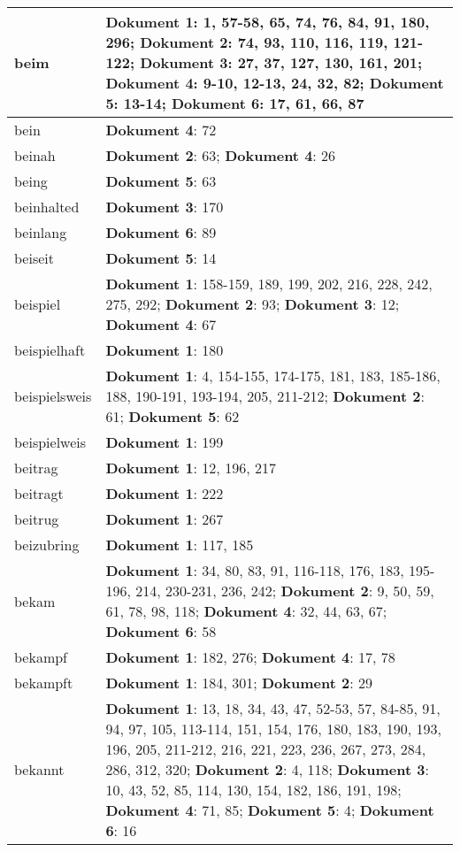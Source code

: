 \documentclass[a5paper]{article}
\begin{document}
\begin{longtable}[l]{|l|p{3in}|}
\hline
beim & \textbf{Dokument 1}: 1, 57-58, 65, 74, 76, 84, 91, 180, 296; \textbf{Dokument 2}: 74, 93, 110, 116, 119, 121-122; \textbf{Dokument 3}: 27, 37, 127, 130, 161, 201; \textbf{Dokument 4}: 9-10, 12-13, 24, 32, 82; \textbf{Dokument 5}: 13-14; \textbf{Dokument 6}: 17, 61, 66, 87 \\
\hline
bein & \textbf{Dokument 4}: 72 \\
\hline
beinah & \textbf{Dokument 2}: 63; \textbf{Dokument 4}: 26 \\
\hline
being & \textbf{Dokument 5}: 63 \\
\hline
beinhalted & \textbf{Dokument 3}: 170 \\
\hline
beinlang & \textbf{Dokument 6}: 89 \\
\hline
beiseit & \textbf{Dokument 5}: 14 \\
\hline
beispiel & \textbf{Dokument 1}: 158-159, 189, 199, 202, 216, 228, 242, 275, 292; \textbf{Dokument 2}: 93; \textbf{Dokument 3}: 12; \textbf{Dokument 4}: 67 \\
\hline
beispielhaft & \textbf{Dokument 1}: 180 \\
\hline
beispielsweis & \textbf{Dokument 1}: 4, 154-155, 174-175, 181, 183, 185-186, 188, 190-191, 193-194, 205, 211-212; \textbf{Dokument 2}: 61; \textbf{Dokument 5}: 62 \\
\hline
beispielweis & \textbf{Dokument 1}: 199 \\
\hline
beitrag & \textbf{Dokument 1}: 12, 196, 217 \\
\hline
beitragt & \textbf{Dokument 1}: 222 \\
\hline
beitrug & \textbf{Dokument 1}: 267 \\
\hline
beizubring & \textbf{Dokument 1}: 117, 185 \\
\hline
bekam & \textbf{Dokument 1}: 34, 80, 83, 91, 116-118, 176, 183, 195-196, 214, 230-231, 236, 242; \textbf{Dokument 2}: 9, 50, 59, 61, 78, 98, 118; \textbf{Dokument 4}: 32, 44, 63, 67; \textbf{Dokument 6}: 58 \\
\hline
bekampf & \textbf{Dokument 1}: 182, 276; \textbf{Dokument 4}: 17, 78 \\
\hline
bekampft & \textbf{Dokument 1}: 184, 301; \textbf{Dokument 2}: 29 \\
\hline
bekannt & \textbf{Dokument 1}: 13, 18, 34, 43, 47, 52-53, 57, 84-85, 91, 94, 97, 105, 113-114, 151, 154, 176, 180, 183, 190, 193, 196, 205, 211-212, 216, 221, 223, 236, 267, 273, 284, 286, 312, 320; \textbf{Dokument 2}: 4, 118; \textbf{Dokument 3}: 10, 43, 52, 85, 114, 130, 154, 182, 186, 191, 198; \textbf{Dokument 4}: 71, 85; \textbf{Dokument 5}: 4; \textbf{Dokument 6}: 16 \\

\end{longtable}
\end{document}
